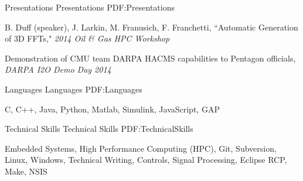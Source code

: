\documentclass[letterpaper,MMMyyyy,nonstopmode]{simpleresumecv}
\begin{document}
\begin{Body}
\endgroup


\Section
{Presentations}
{Presentations}
{PDF:Presentations}

\begingroup

B. Duff (speaker), J. Larkin, M. Franusich, F. Franchetti,
``Automatic Generation of 3D FFTs,"
\textit{2014 Oil \& Gas HPC Workshop}

\Gap
Demonstration of CMU team DARPA HACMS capabilities to Pentagon officials,
\textit{DARPA I2O Demo Day 2014}
\endgroup



\Section
{Languages}
{Languages}
{PDF:Languages}

\begingroup
C, C++, Java, Python, Matlab, Simulink, JavaScript, GAP
\endgroup


\Section
{Technical Skills}
{Technical Skills}
{PDF:TechnicalSkills}

\begingroup
Embedded Systems, High Performance Computing (HPC), Git, Subversion, Linux, Windows, Technical Writing, Controls, Signal Processing, Eclipse RCP, Make, NSIS
\endgroup

\end{Body}
\end{document}
